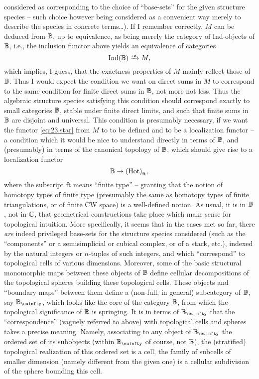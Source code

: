 considered as corresponding to the choice of ``base-sets'' for the
given structure species -- such choice however being considered as a
convenient way merely to describe the species in concrete terms\dots).
If I remember correctly, $M$ can be deduced from ${\mathbb{B}}$, up to
equivalence, as being merely the category of Ind-objects of ${\mathbb{B}}$,
i.e., the inclusion functor above yields an equivalence of categories
\[ \text{Ind}(\bB) \toequ M, \]
which implies, I guess, that the exactness properties of $M$ mainly
reflect those of ${\mathbb{B}}$. Thus I would expect the condition we want
on direct sums in $M$ to correspond to the same condition for finite
direct sums in ${\mathbb{B}}$, not more not less. Thus the algebraic
structure species satisfying this condition should correspond exactly
to small categories ${\mathbb{B}}$, stable under finite direct limits, and
such that finite sums in ${\mathbb{B}}$ are disjoint and universal. This
condition is presumably necessary, if we want the functor
\eqref{eq:23.star} from $M$ to \Hot{} to be defined and to be a
localization functor -- a condition which it would be nice to
understand directly in terms of ${\mathbb{B}}$, and
(presumably) in terms of the canonical topology of ${\mathbb{B}}$, which
should give rise to a localization functor
\[ {\mathbb{B}} \to {\ensuremath{(\mathrm{Hot})}}_{\text{ft}}, \]
where the subscript ft means ``finite type'' -- granting that the
notion of homotopy types of finite type (presumably the same as
homotopy types of finite triangulations, or of finite CW space) is a
well-defined notion. As usual, it is in ${\mathbb{B}}$, not in ${\mathbb{C}}$,
that geometrical constructions take place which make sense for
topological intuition. More specifically, it seems that in the cases
met so far, there \emph{are} indeed privileged base-sets for the
structure species considered (such as the ``components'' or a
semisimplicial or cubical complex, or of a stack, etc.), indexed by
the natural integers or $n$-tuples of such integers, and which
``correspond'' to topological cells of various dimensions. Moreover,
some of the basic structural monomorphic maps between these objects of
${\mathbb{B}}$ define cellular decompositions of the topological spheres
building these topological cells. These objects and ``boundary maps''
between them define a (non-full, in general) subcategory of ${\mathbb{B}}$,
say $\bB_\oo$, which looks like the core of the category ${\mathbb{B}}$,
from which the topological significance of ${\mathbb{B}}$ is springing. It
is in terms of $\bB_\oo$ that the ``correspondence'' (vaguely
referred to above) with topological cells and spheres takes a precise
meaning. Namely, associating to any object of $\bB_\oo$ the ordered
set of its subobjects (within $\bB_\oo$ of course, not ${\mathbb{B}}$),
the (stratified) topological realization of this ordered set is a
cell, the family of subcells of smaller dimension (namely different
from the given one) is a cellular subdivision of the sphere bounding
this cell.

